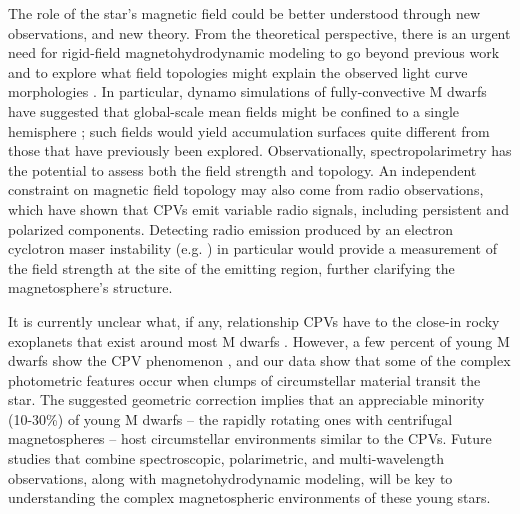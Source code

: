 \documentclass{nature3}
\begin{document}
The role of the star's magnetic field could be better understood
through new observations, and new theory.  From the theoretical
perspective, there is an urgent need for rigid-field
magnetohydrodynamic modeling to go beyond previous work
\cite{Townsend2005,Townsend2008,Krticka2022} and to explore what field
topologies might explain the observed light curve morphologies
\cite{Bouma2024}.  In particular, dynamo simulations of
fully-convective M dwarfs have suggested that global-scale mean fields
might be confined to a single hemisphere \cite{Brown2020}; such fields
would yield accumulation surfaces quite different from those that have
previously been explored.  Observationally, spectropolarimetry has the
potential to assess both the field strength and topology.  An
independent constraint on magnetic field topology may also come from
radio observations, which have shown \cite{Kaur2024} that CPVs emit
variable radio signals, including persistent and polarized components.
Detecting radio emission produced by an electron cyclotron maser
instability (e.g. \cite{Callingham2021}) in particular would provide a
measurement of the field strength at the site of the emitting region,
further clarifying the magnetosphere's structure.

It is currently unclear what, if any, relationship CPVs have to the
close-in rocky exoplanets that exist around most M dwarfs
\cite{Dressing2015}.  However, a few percent of young M dwarfs show
the CPV phenomenon \cite{Rebull2020}, and our data show that some of
the complex photometric features occur when clumps of circumstellar
material transit the star.  The suggested geometric correction implies
that an appreciable minority (10-30\%) of young M dwarfs -- the
rapidly rotating ones with centrifugal magnetospheres -- host
circumstellar environments similar to the CPVs.  Future studies that
combine spectroscopic, polarimetric, and multi-wavelength
observations, along with magnetohydrodynamic modeling, will be key to
understanding the complex magnetospheric environments of these young
stars.



\end{document}
